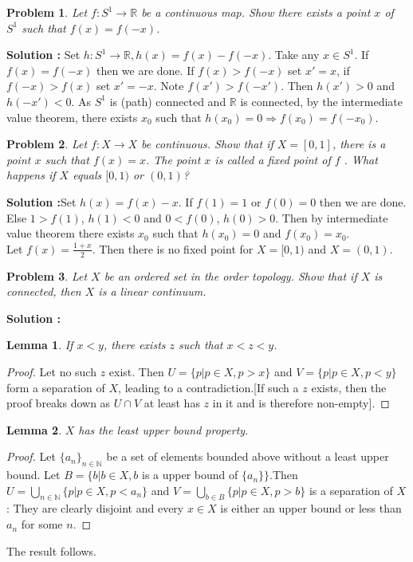 \documentclass{article}
\newtheorem{problem}{Problem}
\numberwithin{problem}{section}
\newtheorem{lemma}{Lemma}
\begin{document}
\begin{tcolorbox}
\begin{problem}
  Let $f : S^1 \to\mathbb R$ be a continuous map. Show there exists a point $x$ of $S^1$ such
that $f (x) = f (-x)$.
\end{problem}
\end{tcolorbox}
\textbf{Solution :} Set $h:S^1\to \mathbb R,h(x)=f(x)-f(-x)$. Take any $x\in S^1$. If $f(x)=f(-x)$ then we are done. If $f(x)>f(-x)$ set $x'=x$, if $f(-x)>f(x)$ set $x'=-x$. Note $f(x')>f(-x')$. Then $h(x')>0$ and $h(-x')<0$. As $S^1$ is (path) connected and $\mathbb R$ is connected, by the intermediate value theorem, there exists $x_0$ such that $h(x_0)=0\Rightarrow f(x_0)=f(-x_0)$.
\begin{tcolorbox}
\begin{problem}
Let $f : X \to X$ be continuous. Show that if $X = [0, 1]$, there is a point $x$ such
that $f (x) = x$. The point $x$ is called a fixed point of $f$ . What happens if $X$
equals $[0, 1)$ or $(0, 1)$?
\end{problem}
\end{tcolorbox}
\textbf{Solution :}Set $h(x)=f(x)-x$. If $f(1)=1$ or $f(0)=0$ then we are done. Else $1>f(1)$, $h(1)<0$ and $0<f(0)$, $h(0)>0$. Then by intermediate value theorem there exists $x_0$ such that $h(x_0)=0$ and $f(x_0)=x_0$.\\
Let $f(x)=\frac{1+x}{2}$. Then there is no fixed point for $X=[0,1)$ and $X=(0,1)$.
\begin{tcolorbox}


\begin{problem}
Let $X$ be an ordered set in the order topology. Show that if $X$ is connected, then
$X$ is a linear continuum.
\end{problem}
\end{tcolorbox}
\textbf{Solution :}
\begin{lemma}
If $x < y$, there exists $z$ such that $x < z < y$.
\end{lemma}
\begin{proof}
Let no such $z$ exist. Then $U=\{p|p\in X,p>x\}$ and $V=\{p|p\in X,p<y\}$ form a separation of $X$, leading to a contradiction.[If such a $z$ exists, then the proof breaks down as $U\cap V$ at least has $z$ in it and is therefore non-empty].
\end{proof}
\begin{lemma}
$X$ has the least upper bound property.
\end{lemma}
\begin{proof}
Let $\{a_n\}_{n\in\mathbb N}$ be a set of elements bounded above without a least upper bound. Let $B=\{b|b\in X,b$ is a upper bound of $\{a_n\}\}$.Then $U=\bigcup_{n\in\mathbb N}\{p|p\in X,p<a_n\}$ and $V=\bigcup_{b\in B}\{p|p\in X,p>b\}$ is a separation of $X$: They are clearly disjoint and every $x\in X$ is either an upper bound or less than $a_n$ for some $n$.
\end{proof}
The result follows.
\end{document}
